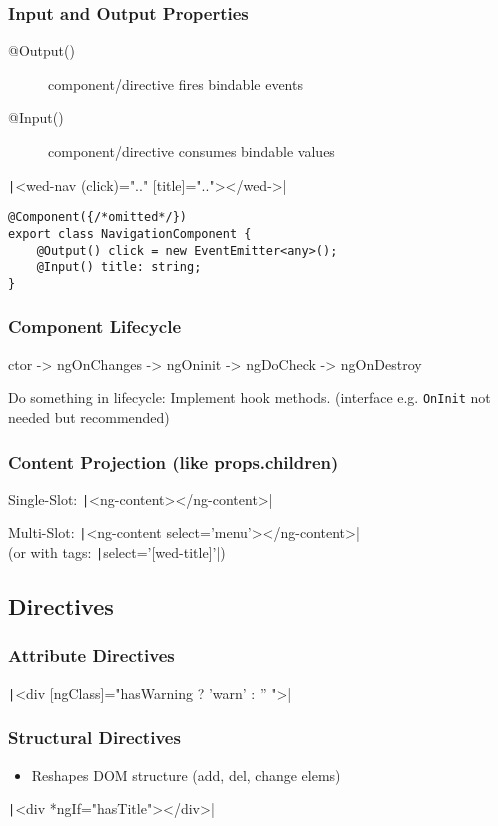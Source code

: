 \begin{multicols*}{2}
\subsubsection{Input and Output Properties}
\begin{description}
    \item[@Output()] component/directive fires bindable events
    \item[@Input()] component/directive consumes bindable values
\end{description}
\texttt|<wed-nav (click)=".." [title]=".."></wed->|
\begin{verbatim}
@Component({/*omitted*/})
export class NavigationComponent {
    @Output() click = new EventEmitter<any>();
    @Input() title: string;
}
\end{verbatim}

\subsubsection{Component Lifecycle}
ctor -> ngOnChanges -> ngOninit -> ngDoCheck -> ngOnDestroy

Do something in lifecycle: Implement hook methods. (interface e.g. \lstinline|OnInit| not needed but recommended)

\subsubsection{Content Projection (like props.children)}
Single-Slot: \texttt|<ng-content></ng-content>|

Multi-Slot:
\texttt|<ng-content select='menu'></ng-content>| \\
(or with tags: \texttt|select='[wed-title]'|)

\subsection{Directives}
\subsubsection{Attribute Directives}
\texttt|<div [ngClass]="hasWarning ? 'warn' : '' ">|
\subsubsection{Structural Directives}
\begin{itemize}
    \item Reshapes DOM structure (add, del, change elems)
\end{itemize}
\texttt|<div *ngIf="hasTitle"></div>|


\end{multicols*}
